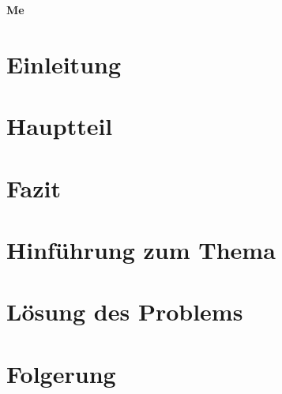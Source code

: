 \documentclass[
	final,
	a4paper,
	oneside,
	parskip=full,
	headings=standardclasses,
	headings=big,
	pointednumbers,
    fleqn
]{scrartcl}
\begin{document}
    \begin{titlepage}
        \textbf{\Huge Me}
    \end{titlepage}


    \section{Einleitung}
    \lipsum[1]


    \section{Hauptteil}
    \lipsum

    \section{Fazit}
    \lipsum[5-7]
    
    \lipsum[2]


    \section{Hinführung zum Thema}
    \lipsum[3-5]

    \section{Lösung des Problems}
    \lipsum

    \section{Folgerung}
    \lipsum[1-3]

    \lipsum
\end{document}
